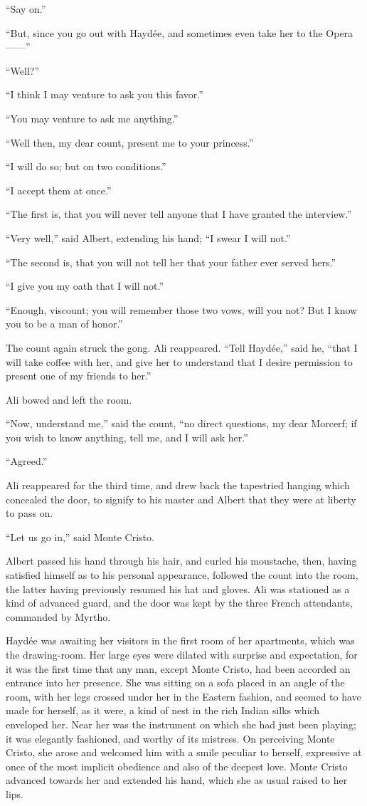 “Say on.”

“But, since you go out with Haydée, and sometimes even take her to the
Opera——”

“Well?”

“I think I may venture to ask you this favor.”

“You may venture to ask me anything.”

“Well then, my dear count, present me to your princess.”

“I will do so; but on two conditions.”

“I accept them at once.”

“The first is, that you will never tell anyone that I have granted the
interview.”

“Very well,” said Albert, extending his hand; “I swear I will not.”

“The second is, that you will not tell her that your father ever served
hers.”

“I give you my oath that I will not.”

“Enough, viscount; you will remember those two vows, will you not? But
I know you to be a man of honor.”

The count again struck the gong. Ali reappeared. “Tell Haydée,” said
he, “that I will take coffee with her, and give her to understand that
I desire permission to present one of my friends to her.”

Ali bowed and left the room.

“Now, understand me,” said the count, “no direct questions, my dear
Morcerf; if you wish to know anything, tell me, and I will ask her.”

“Agreed.”

Ali reappeared for the third time, and drew back the tapestried hanging
which concealed the door, to signify to his master and Albert that they
were at liberty to pass on.

“Let us go in,” said Monte Cristo.

Albert passed his hand through his hair, and curled his moustache,
then, having satisfied himself as to his personal appearance, followed
the count into the room, the latter having previously resumed his hat
and gloves. Ali was stationed as a kind of advanced guard, and the door
was kept by the three French attendants, commanded by Myrtho.

Haydée was awaiting her visitors in the first room of her apartments,
which was the drawing-room. Her large eyes were dilated with surprise
and expectation, for it was the first time that any man, except Monte
Cristo, had been accorded an entrance into her presence. She was
sitting on a sofa placed in an angle of the room, with her legs crossed
under her in the Eastern fashion, and seemed to have made for herself,
as it were, a kind of nest in the rich Indian silks which enveloped
her. Near her was the instrument on which she had just been playing; it
was elegantly fashioned, and worthy of its mistress. On perceiving
Monte Cristo, she arose and welcomed him with a smile peculiar to
herself, expressive at once of the most implicit obedience and also of
the deepest love. Monte Cristo advanced towards her and extended his
hand, which she as usual raised to her lips.

